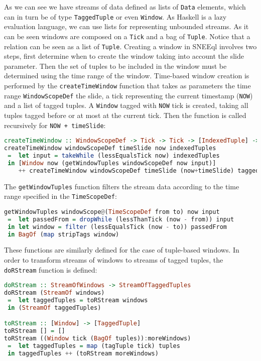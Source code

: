 As we can see we have streams of data defined as lists of \texttt{Data} elements, which can in turn be of type \texttt{TaggedTuple} or even \texttt{Window}. As Haskell is a lazy evaluation language, we can use lists for representing unbounded streams. As it can be seen windows are composed on a \texttt{Tick} and a bag of \texttt{Tuple}. Notice that a relation can be seen as a list of \texttt{Tuple}.
Creating a window in SNEEql involves two steps, first determine when to create the window taking into account the slide parameter. Then the set of tuples to be included in the window must be determined using the time range of the window.
Time-based window creation is performed by the \texttt{createTimeWindow} function that takes as parameters the time range \texttt{WindowScopeDef} the slide, a tick representing the current timestamp (\texttt{NOW}) and a list of tagged tuples. A \texttt{Window} tagged with \texttt{NOW} tick is created, taking all tuples tagged before or at most at the current tick. Then the function is called recursively for \texttt{NOW + timeSlide}:
 
\begin{lstlisting}[style=HaskellSNEE,language=Haskell,frame=none]
createTimeWindow :: WindowScopeDef -> Tick -> Tick -> [IndexedTuple] -> [Window] 
createTimeWindow windowScopeDef timeSlide now indexedTuples
 =	let input = takeWhile (lessEqualsTick now) indexedTuples
 in [Window now (getWindowTuples windowScopeDef now input)]
	++ createTimeWindow windowScopeDef timeSlide (now+timeSlide) taggedTuples
\end{lstlisting}

The \texttt{getWindowTuples} function filters the stream data according to the time range specified in the \texttt{TimeScopeDef}:

\begin{lstlisting}[style=HaskellSNEE,language=Haskell,frame=none]
getWindowTuples windowScope@(TimeScopeDef from to) now input
 =	let passedFrom = dropWhile (lessThanTick (now - from)) input
 in let window = filter (lessEqualsTick (now - to)) passedFrom
 in BagOf (map stripTags window)
\end{lstlisting}

These functions are similarly defined for the case of tuple-based windows. In order to transform streams of windows to streams of tagged tuples, the \texttt{doRStream} function is defined:

\begin{lstlisting}[style=HaskellSNEE,language=Haskell,frame=none]
doRStream :: StreamOfWindows -> StreamOfTaggedTuples
doRStream (StreamOf windows)
 =	let taggedTuples = toRStream windows
 in (StreamOf taggedTuples)

toRStream :: [Window] -> [TaggedTuple]
toRStream [] = []
toRStream ((Window tick (BagOf tuples)):moreWindows)
 =	let taggedTuples = map (tagTuple tick) tuples
 in taggedTuples ++ (toRStream moreWindows)
\end{lstlisting}

